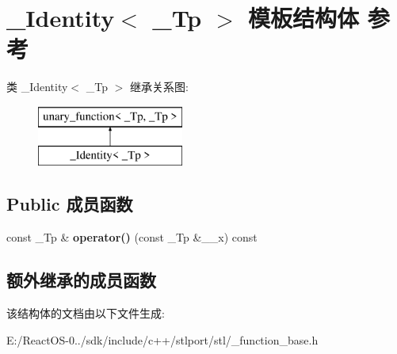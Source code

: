 \hypertarget{struct___identity}{}\section{\+\_\+\+Identity$<$ \+\_\+\+Tp $>$ 模板结构体 参考}
\label{struct___identity}
类 \+\_\+\+Identity$<$ \+\_\+\+Tp $>$ 继承关系图\+:\begin{figure}[H]
\begin{center}
\leavevmode
\includegraphics[height=2.000000cm]{struct___identity}
\end{center}
\end{figure}
\subsection*{Public 成员函数}
\begin{DoxyCompactItemize}
\item 
\mbox{\label{struct___identity_a8751ad9259b20eded719378ff98b41a8}} 
const \+\_\+\+Tp \& {\bfseries operator()} (const \+\_\+\+Tp \&\+\_\+\+\_\+x) const
\end{DoxyCompactItemize}
\subsection*{额外继承的成员函数}


该结构体的文档由以下文件生成\+:\begin{DoxyCompactItemize}
\item 
E\+:/\+React\+O\+S-\/0../sdk/include/c++/stlport/stl/\+\_\+function\+\_\+base.\+h\end{DoxyCompactItemize}
